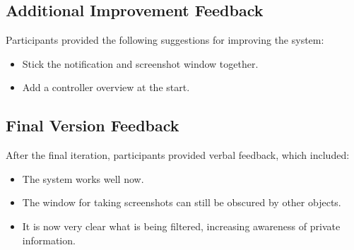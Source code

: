 \documentclass[sigconf,authordraft]{acmart}
\begin{document}
\subsection{Additional Improvement Feedback}
Participants provided the following suggestions for improving the system:
\begin{itemize}
    \item Stick the notification and screenshot window together.
    \item Add a controller overview at the start.
\end{itemize}

\subsection{Final Version Feedback}
After the final iteration, participants provided verbal feedback, which included:
\begin{itemize}
    \item The system works well now.
    \item The window for taking screenshots can still be obscured by other objects.
    \item It is now very clear what is being filtered, increasing awareness of private information.
\end{itemize}


    
\end{document}
